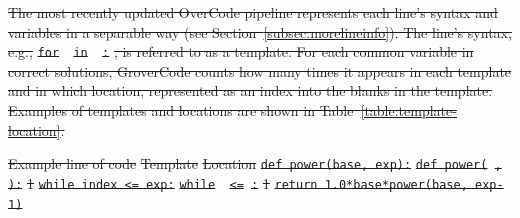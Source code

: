 \documentclass[12pt,twoside]{mitthesis}
\providecommand{\DIFdeltex}[1]{{\protect\color{red}\sout{#1}}}                      %
\providecommand{\DIFdelFL}[1]{\DIFdel{#1}} %
\providecommand{\DIFdel}[1]{\texorpdfstring{\DIFdeltex{#1}}{}} %
\begin{document}
{{{{{{{{{{%
\DIFdel{The most recently updated OverCode pipeline represents each line's syntax and variables in a separable way (see Section~\ref{subsec:morelineinfo}). The line's syntax, e.g., }\texttt{\DIFdel{for }\underline{\DIFdel{\hspace{1em}}} %
\DIFdel{in }\underline{\DIFdel{\hspace{1em}}}%
\DIFdel{:}}%
\DIFdel{, is referred to as a template. For each common variable in correct solutions, GroverCode counts how many times it appears in each template and in which location, represented as an index into the blanks in the template. Examples of templates and locations are shown in Table~\ref{table:template-location}. 
}%

\DIFdelFL{Example line of code }%
\DIFdelFL{Template }%
\DIFdelFL{Location }%
\texttt{\DIFdelFL{def power(base, exp):}} %
\texttt{\DIFdelFL{def power(}\underline{\DIFdelFL{\hspace{1em}}}%
\DIFdelFL{,}\underline{\DIFdelFL{\hspace{1em}}}%
\DIFdelFL{):}} %
\DIFdelFL{1 }%
\texttt{\DIFdelFL{while index <= exp:}} %
\texttt{\DIFdelFL{while }\underline{\DIFdelFL{\hspace{1em}}}%
\DIFdelFL{<=}\underline{\DIFdelFL{\hspace{1em}}}%
\DIFdelFL{:}} %
\DIFdelFL{1 }%
\texttt{\DIFdelFL{return 1.0*base*power(base, exp-1)}} %
}}}}}}}}}}
\end{document}
